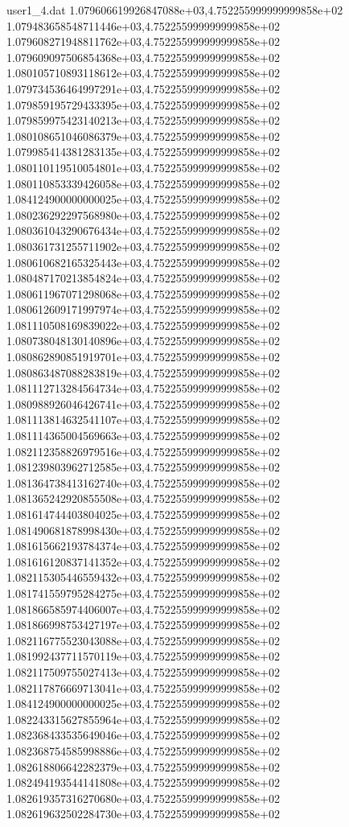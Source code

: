 \begin{filecontents}{user1_4.dat}
1.079606619926847088e+03,4.752255999999999858e+02
1.079483658548711446e+03,4.752255999999999858e+02
1.079608271948811762e+03,4.752255999999999858e+02
1.079609097506854368e+03,4.752255999999999858e+02
1.080105710893118612e+03,4.752255999999999858e+02
1.079734536464997291e+03,4.752255999999999858e+02
1.079859195729433395e+03,4.752255999999999858e+02
1.079859975423140213e+03,4.752255999999999858e+02
1.080108651046086379e+03,4.752255999999999858e+02
1.079985414381283135e+03,4.752255999999999858e+02
1.080110119510054801e+03,4.752255999999999858e+02
1.080110853339426058e+03,4.752255999999999858e+02
1.084124900000000025e+03,4.752255999999999858e+02
1.080236292297568980e+03,4.752255999999999858e+02
1.080361043290676434e+03,4.752255999999999858e+02
1.080361731255711902e+03,4.752255999999999858e+02
1.080610682165325443e+03,4.752255999999999858e+02
1.080487170213854824e+03,4.752255999999999858e+02
1.080611967071298068e+03,4.752255999999999858e+02
1.080612609171997974e+03,4.752255999999999858e+02
1.081110508169839022e+03,4.752255999999999858e+02
1.080738048130140896e+03,4.752255999999999858e+02
1.080862890851919701e+03,4.752255999999999858e+02
1.080863487088283819e+03,4.752255999999999858e+02
1.081112713284564734e+03,4.752255999999999858e+02
1.080988926046426741e+03,4.752255999999999858e+02
1.081113814632541107e+03,4.752255999999999858e+02
1.081114365004569663e+03,4.752255999999999858e+02
1.082112358826979516e+03,4.752255999999999858e+02
1.081239803962712585e+03,4.752255999999999858e+02
1.081364738413162740e+03,4.752255999999999858e+02
1.081365242920855508e+03,4.752255999999999858e+02
1.081614744403804025e+03,4.752255999999999858e+02
1.081490681878998430e+03,4.752255999999999858e+02
1.081615662193784374e+03,4.752255999999999858e+02
1.081616120837141352e+03,4.752255999999999858e+02
1.082115305446559432e+03,4.752255999999999858e+02
1.081741559795284275e+03,4.752255999999999858e+02
1.081866585974406007e+03,4.752255999999999858e+02
1.081866998753427197e+03,4.752255999999999858e+02
1.082116775523043088e+03,4.752255999999999858e+02
1.081992437711570119e+03,4.752255999999999858e+02
1.082117509755027413e+03,4.752255999999999858e+02
1.082117876669713041e+03,4.752255999999999858e+02
1.084124900000000025e+03,4.752255999999999858e+02
1.082243315627855964e+03,4.752255999999999858e+02
1.082368433535649046e+03,4.752255999999999858e+02
1.082368754585998886e+03,4.752255999999999858e+02
1.082618806642282379e+03,4.752255999999999858e+02
1.082494193544141808e+03,4.752255999999999858e+02
1.082619357316270680e+03,4.752255999999999858e+02
1.082619632502284730e+03,4.752255999999999858e+02

\end{filecontents}
